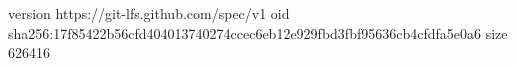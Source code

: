 version https://git-lfs.github.com/spec/v1
oid sha256:17f85422b56cfd404013740274ccec6eb12e929fbd3fbf95636cb4cfdfa5e0a6
size 626416
